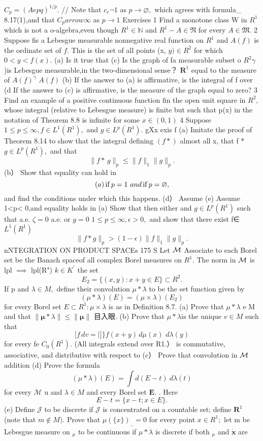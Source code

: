 $C_{p}=(A e p q)^{1/p}.$ // Note that $c_{r}\lnot1$ as $p\to\varnothing,$ which agrees with formula_ 8.17(1),and that $C_{p}{ arrow}\infty$ as $p\to1$ Exercises 1 Find a monotone class W in $R^{1}$ which is not a o-algebra,even though $R^{1}\in\mathbb{N}$ and $R^{1}-A\in\mathfrak{N}$ for every $A\in\mathfrak{M}.$ 2 Suppose fis a Lebesgue measurable nonnegative real function on $R^{1}$ and $A(f)$ is the ordinate set of $f.$ This is the set of all points (x, $y)\in R^{2}$ for which $0<y<f(x).$ (a) Is it true that (c) Is the graph of fa measurable subset o $R^{2}\gamma$ )is Lebesgue measurable,in the two-dimensional sense？ ${\boldsymbol{R}}^{1}$ equal to the measure of $A(f)^{\gamma}$ $A(f)$ (b) If the answer to (a) is affirmative, is the integral of f over (d If the answer to (c) is affirmative, is the measure of the graph equal to zero? 3 Find an example of a positive continuous function fin the open unit square in $R^{2},$ whose integral (relative to Lebesgue measure) is finite but such that p(x) in the notation of Theorem 8.8 is infinite for some $x\in(0,1)$ 4 Suppose $1\leq p\leq\infty,f\in L^{1}(R^{1}),$ and $g\in L^{p}(R^{1}).$ gXx exis f (a) Imitate the proof of Theorem 8.14 to show that the integral defining $(f*)$ almost all x, that f * $g\in L^{p}(R^{1}),$ and that $$ \|f*\,g\|_{p}\leq\|f\|_{1}\|g\|_{p}. $$ (b） Show that equality can hold in $$ (a)\*\operatorname{if}p=1\ a n d\operatorname{if}p=\varnothing, $$ and find the conditions under which this happens. (d） Assume (e) Assume 1<p< 0,and equality holds in (a) Show that then either and $g\in L^{p}(R^{1})$ such that a.e. $\textstyle\zeta=0$ a.e. or $g=0$ $1\leq p\leq\infty,\epsilon>0,$ and show that there exist f∈ $L^{1}(R^{1})$ $$ \|f*g\|_{p}>(1-\epsilon)\|f\|_{1}\|g\|_{p}. $$nNTEGRATION ON PRODUCT SPACEs 175 S Let ${\cal{M}}$ Associate to each Borel set be the Banach spaceof all complex Borel measures on $R^{1}.$ The norm in ${\cal{M}}$ is lpl $\implies$ lpl(R") $\scriptstyle k\in K^{\prime}$ the set $$ E_{2}=\{(x,y)\colon x+y\in E\}\subset R^{2}. $$ If p and $\lambda\in M,$ define their convolution $\mu*\lambda$ to be the set function given by $$ (\mu\ast\lambda)(E)=(\mu\times\lambda)(E_{2}) $$ for every Borel set $E\subset R^{1}:\mu\times\lambda$ is as in Definition $8.7.$ (a) Prove that $\mu*\lambda$ e M and that $\|{\boldsymbol{\mu}}\ast\lambda\|\leq\|{\boldsymbol{\mu}}\|$ 目入眼. (b) Prove that $\mu*{\lambda}{\mathrm{i}}{\mathrm{s}}$ the unique $v\in M$ such that $$ {\Bigg[}f\,d v= |{\Bigg]}{\Bigg\}}f(x+y)\,d\mu(x)\,\,d\lambda(y) $$ for every fe $C_{0}(R^{1}).$ (All integrals extend over R1.） is commutative, associative, and distributive with respect to (c） Prove that convolution in ${\cal{M}}$ addition (d) Prove the formula $$ (\mu\ast\lambda)(E)=\int d(E-t)~d\lambda(t) $$ for every $\mathcal{M}$ u and $\lambda\in M$ and every Borel set ${\boldsymbol{E}}.$ . Here $$ E-t=\{x-t;x\in E\}. $$ (e) Define $\mathcal{J}$ to be discrete if $\mathcal{J}$ is concentrated on a countable set; define ${\boldsymbol{R}}^{1}$ (note that $m\notin M).$ Prove that $\mu(\{x\})_{_{\sim}}=0$ for every point $x\in R^{1};$ let m be Lebesgue measure on ${}_{\mu}$ to be continuous if $\mu*{\dot{\lambda}}$ is discrete if both ${}_{\mu}$ and $\dot{\boldsymbol{x}}$ are 